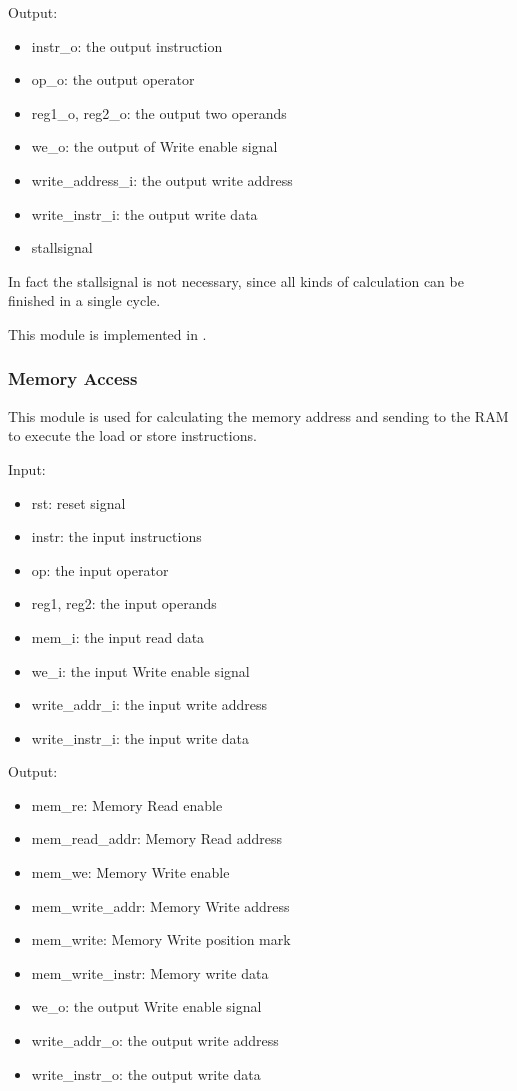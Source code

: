 \documentclass{article}
\begin{document}
Output:

\begin{itemize}
\item instr\_o: the output instruction
\item op\_o: the output operator
\item reg1\_o, reg2\_o: the output two operands
\item we\_o: the output of Write enable signal
\item write\_address\_i: the output write address
\item write\_instr\_i: the output write data
\item stallsignal
\end{itemize}

In fact the stallsignal is not necessary, since all kinds of calculation can be finished in a single cycle.

This module is implemented in .

\newpage
\subsubsection{Memory Access}
This module is used for calculating the memory address and sending to the RAM to execute the load or store instructions.

Input:

\begin{itemize}
\item rst: reset signal
\item instr: the input instructions
\item op: the input operator
\item reg1, reg2: the input operands
\item mem\_i: the input read data
\item we\_i: the input Write enable signal
\item write\_addr\_i: the input write address
\item write\_instr\_i: the input write data
\end{itemize}

Output:

\begin{itemize}
\item mem\_re: Memory Read enable
\item mem\_read\_addr: Memory Read address
\item mem\_we: Memory Write enable
\item mem\_write\_addr: Memory Write address
\item mem\_write: Memory Write position mark
\item mem\_write\_instr: Memory write data
\item we\_o: the output Write enable signal
\item write\_addr\_o: the output write address
\item write\_instr\_o: the output write data
\end{itemize}
\end{document}
